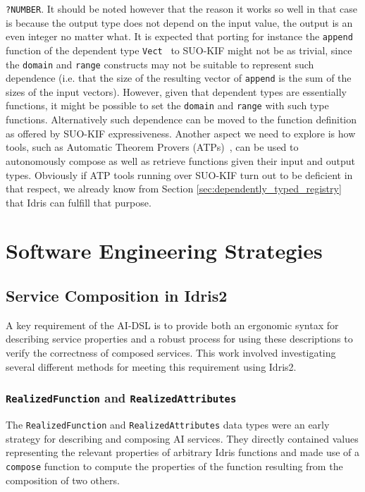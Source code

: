 \documentclass[]{report}
\begin{document}
\begin{itemize}
\texttt{?NUMBER}.  It should be noted however that the reason it works
so well in that case is because the output type does not depend on the
input value, the output is an even integer no matter what.  It is
expected that porting for instance the \texttt{append} function of the
dependent type \texttt{Vect}~\cite{Vectors} to SUO-KIF might not be as
trivial, since the \texttt{domain} and \texttt{range} constructs may
not be suitable to represent such dependence (i.e. that the size of
the resulting vector of \texttt{append} is the sum of the sizes of the
input vectors).  However, given that dependent types are essentially
functions, it might be possible to set the \texttt{domain} and
\texttt{range} with such type functions.  Alternatively such
dependence can be moved to the function definition as offered by
SUO-KIF expressiveness.  Another aspect we need to explore is how
tools, such as Automatic Theorem Provers
(ATPs)~\cite{Baumgartner_automatedreasoning, Urban_anoverview,
  Alvez_evaluating_atp_adimen_SUMO}, can be used to autonomously
compose as well as retrieve functions given their input and output
types.  Obviously if ATP tools running over SUO-KIF turn out to be
deficient in that respect, we already know from Section
\ref{sec:dependently_typed_registry} that Idris can fulfill that
purpose.
\end{itemize}

\chapter{Software Engineering Strategies}
\label{chap:soft_eng_strat}
\section{Service Composition in Idris2}
\label{sec:service_composition_in_idris2}

A key requirement of the AI-DSL is to provide both an ergonomic syntax for
describing service properties and a robust process for using these descriptions
to verify the correctness of composed services.  This work involved
investigating several different methods for meeting this requirement using
Idris2.

\subsection{\texttt{RealizedFunction} and \texttt{RealizedAttributes}}
The \texttt{RealizedFunction} and \texttt{RealizedAttributes} data types were an
early strategy for describing and composing AI services.  They directly
contained values representing the relevant properties of arbitrary Idris
functions and made use of a \texttt{compose} function to compute the properties
of the function resulting from the composition of two others.
\end{document}
